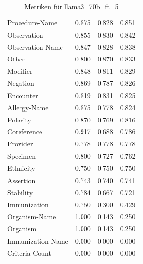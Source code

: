 \begin{table}[htbp]
\begin{tabular}{p{5cm}ccc}
Procedure-Name & 0.875 & 0.828 & 0.851 \\
Observation & 0.855 & 0.830 & 0.842 \\
Observation-Name & 0.847 & 0.828 & 0.838 \\
Other & 0.800 & 0.870 & 0.833 \\
Modifier & 0.848 & 0.811 & 0.829 \\
Negation & 0.869 & 0.787 & 0.826 \\
Encounter & 0.819 & 0.831 & 0.825 \\
Allergy-Name & 0.875 & 0.778 & 0.824 \\
Polarity & 0.870 & 0.769 & 0.816 \\
Coreference & 0.917 & 0.688 & 0.786 \\
Provider & 0.778 & 0.778 & 0.778 \\
Specimen & 0.800 & 0.727 & 0.762 \\
Ethnicity & 0.750 & 0.750 & 0.750 \\
Assertion & 0.743 & 0.740 & 0.741 \\
Stability & 0.784 & 0.667 & 0.721 \\
Immunization & 0.750 & 0.300 & 0.429 \\
Organism-Name & 1.000 & 0.143 & 0.250 \\
Organism & 1.000 & 0.143 & 0.250 \\
Immunization-Name & 0.000 & 0.000 & 0.000 \\
Criteria-Count & 0.000 & 0.000 & 0.000 \\
\bottomrule
\end{tabular}
\caption{Metriken für llama3_70b_ft_5}
\label{tab:metrics_llama3_70b_ft_5}
\end{table}
